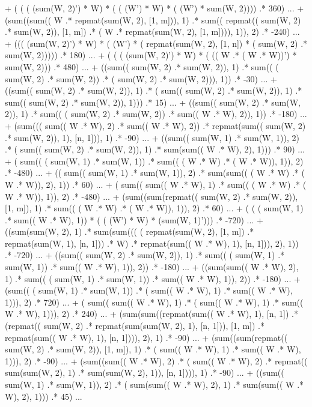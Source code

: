 \documentclass{article}
\begin{document}
  + ( ( ( (sum(W, 2)') * W) * ( ( (W') * W) * ( (W') * sum(W, 2)))) .* 360) ...
  + (sum((sum(( W .* repmat(sum(W, 2), [1, m])), 1)  .* sum(( repmat(( sum(W, 2) .* sum(W, 2)), [1, m]) .* ( W .* repmat(sum(W, 2), [1, m]))), 1)), 2)  .* -240) ...
  + ((( (sum(W, 2)') * W)  * ( (W') * ( repmat(sum(W, 2), [1, n]) * ( sum(W, 2) .* sum(W, 2)))))  .* 180) ...
  + ( ( ( (sum(W, 2)') * W) * ( (( W .* ( W .* W))') * sum(W, 2))) .* 480) ...
  + ((sum(( sum(W, 2) .* sum(W, 2)), 1)  .* sum(( ( sum(W, 2) .* sum(W, 2)) .* ( sum(W, 2) .* sum(W, 2))), 1))  .* -30) ...
  + ((sum(( sum(W, 2) .* sum(W, 2)), 1)  .* ( sum(( sum(W, 2) .* sum(W, 2)), 1) .* sum(( sum(W, 2) .* sum(W, 2)), 1)))  .* 15) ...
  + ((sum(( sum(W, 2) .* sum(W, 2)), 1)  .* sum(( ( sum(W, 2) .* sum(W, 2)) .* sum(( W .* W), 2)), 1))  .* -180) ...
  + (sum((( sum(( W .* W), 2) .* sum(( W .* W), 2))  .* repmat(sum(( sum(W, 2) .* sum(W, 2)), 1), [n, 1])), 1)  .* -90) ...
  + ((sum(( sum(W, 1) .* sum(W, 1)), 2)  .* ( sum(( sum(W, 2) .* sum(W, 2)), 1) .* sum(sum(( W .* W), 2), 1)))  .* 90) ...
  + ( sum(( ( sum(W, 1) .* sum(W, 1)) .* sum(( ( W .* W) .* ( W .* W)), 1)), 2) .* -480) ...
  + (( sum(( sum(W, 1) .* sum(W, 1)), 2) .* sum(sum(( ( W .* W) .* ( W .* W)), 2), 1))  .* 60) ...
  + ( sum(( sum(( W .* W), 1) .* sum(( ( W .* W) .* ( W .* W)), 1)), 2) .* -480) ...
  + (sum((sum(repmat(( sum(W, 2) .* sum(W, 2)), [1, m]), 1)  .* sum(( ( W .* W) .* ( W .* W)), 1)), 2)  .* 60) ...
  + ( ( ( sum(W, 1) .* sum(( W .* W), 1)) * ( ( (W') * W) * (sum(W, 1)'))) .* -720) ...
  + ((sum(sum(W, 2), 1)  .* sum(sum((( ( repmat(sum(W, 2), [1, m]) .* repmat(sum(W, 1), [n, 1])) .* W)  .* repmat(sum(( W .* W), 1), [n, 1])), 2), 1))  .* -720) ...
  + ((sum(( sum(W, 2) .* sum(W, 2)), 1)  .* sum(( ( sum(W, 1) .* sum(W, 1)) .* sum(( W .* W), 1)), 2))  .* -180) ...
  + ((sum(sum(( W .* W), 2), 1)  .* sum(( ( sum(W, 1) .* sum(W, 1)) .* sum(( W .* W), 1)), 2))  .* -180) ...
  + (sum(( ( sum(W, 1) .* sum(W, 1)) .* ( sum(( W .* W), 1) .* sum(( W .* W), 1))), 2)  .* 720) ...
  + ( sum(( sum(( W .* W), 1) .* ( sum(( W .* W), 1) .* sum(( W .* W), 1))), 2) .* 240) ...
  + (sum(sum((repmat(sum(( W .* W), 1), [n, 1])  .* (repmat(( sum(W, 2) .* repmat(sum(sum(W, 2), 1), [n, 1])), [1, m])  .* repmat(sum(( W .* W), 1), [n, 1]))), 2), 1)  .* -90) ...
  + (sum((sum(repmat(( sum(W, 2) .* sum(W, 2)), [1, m]), 1)  .* ( sum(( W .* W), 1) .* sum(( W .* W), 1))), 2)  .* -90) ...
  + (sum((sum(( W .* W), 2)  .* ( sum(( W .* W), 2) .* repmat(( sum(sum(W, 2), 1) .* sum(sum(W, 2), 1)), [n, 1]))), 1)  .* -90) ...
  + ((sum(( sum(W, 1) .* sum(W, 1)), 2)  .* ( sum(sum(( W .* W), 2), 1) .* sum(sum(( W .* W), 2), 1)))  .* 45) ...
\end{document}
